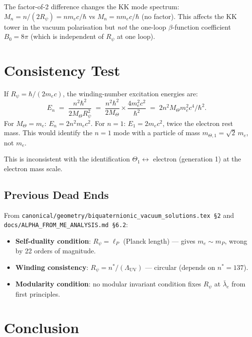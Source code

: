 \documentclass[12pt,a4paper]{article}
\theoremstyle{definition}
\theoremstyle{remark}
\begin{document}
The factor-of-2 difference changes the KK mode spectrum:
$M_n = n/(2R_\psi) = n m_e c/\hbar$ vs $M_n = n m_e c/\hbar$ (no factor).
This affects the KK tower in the vacuum polarisation but \emph{not}
the one-loop $\beta$-function coefficient $B_0 = 8\pi$ (which is
independent of $R_\psi$ at one loop).

\section{Consistency Test}
\label{sec:consistency}

If $R_\psi = \hbar/(2m_e c)$, the winding-number excitation energies are:
\begin{equation}
  E_n \;=\; \frac{n^2\hbar^2}{2M_\Theta R_\psi^2}
       \;=\; \frac{n^2\hbar^2}{2M_\Theta} \times \frac{4m_e^2 c^2}{\hbar^2}
       \;=\; 2n^2 M_\Theta m_e^2 c^4 / \hbar^2.
\end{equation}
For $M_\Theta = m_e$: $E_n = 2n^2 m_e c^2$.  For $n=1$: $E_1 = 2m_e c^2$,
twice the electron rest mass.  This would identify the $n=1$ mode with a
particle of mass $m_{\Theta,1} = \sqrt{2}\,m_e$, not $m_e$.

This is inconsistent with the identification $\Theta_1 \leftrightarrow$
electron (generation 1) at the electron mass scale.

\subsection{Previous Dead Ends}
From \texttt{canonical/geometry/biquaternionic\_vacuum\_solutions.tex~§2}
and \texttt{docs/ALPHA\_FROM\_ME\_ANALYSIS.md~§6.2}:
\begin{itemize}
  \item \textbf{Self-duality condition}: $R_\psi = \ell_P$ (Planck length)
        --- gives $m_e \sim m_P$, wrong by 22 orders of magnitude.
  \item \textbf{Winding consistency}: $R_\psi = n^*/(\Lambda_{\mathrm{UV}})$
        --- circular (depends on $n^* = 137$).
  \item \textbf{Modularity condition}: no modular invariant condition
        fixes $R_\psi$ at $\bar\lambda_e$ from first principles.
\end{itemize}

\section{Conclusion}
\label{sec:conclusion}
\end{document}
